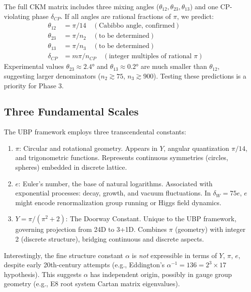 \documentclass[11pt,a4paper]{article}
\begin{document}
The full CKM matrix includes three mixing angles ($\theta_{12}, \theta_{23}, \theta_{13}$) and one CP-violating phase $\delta_{CP}$. If all angles are rational fractions of $\pi$, we predict:
\begin{align}
\theta_{12} &= \pi/14 \quad (\text{Cabibbo angle, confirmed}) \\
\theta_{23} &= \pi/n_2 \quad (\text{to be determined}) \\
\theta_{13} &= \pi/n_3 \quad (\text{to be determined}) \\
\delta_{CP} &= m \pi / n_{CP} \quad (\text{integer multiples of rational } \pi)
\end{align}
Experimental values $\theta_{23} \approx 2.4°$ and $\theta_{13} \approx 0.2°$ are much smaller than $\theta_{12}$, suggesting larger denominators ($n_2 \gtrsim 75$, $n_3 \gtrsim 900$). Testing these predictions is a priority for Phase 3.

\subsection{Three Fundamental Scales}

The UBP framework employs three transcendental constants:
\begin{enumerate}
\item \textbf{$\pi$}: Circular and rotational geometry. Appears in $Y$, angular quantization $\pi/14$, and trigonometric functions. Represents continuous symmetries (circles, spheres) embedded in discrete lattice.

\item \textbf{$e$}: Euler's number, the base of natural logarithms. Associated with exponential processes: decay, growth, and vacuum fluctuations. In $\delta_W = 75e$, $e$ might encode renormalization group running or Higgs field dynamics.

\item \textbf{$Y = \pi/(\pi^2+2)$}: The Doorway Constant. Unique to the UBP framework, governing projection from 24D to 3+1D. Combines $\pi$ (geometry) with integer 2 (discrete structure), bridging continuous and discrete aspects.
\end{enumerate}

Interestingly, the fine structure constant $\alpha$ is \emph{not} expressible in terms of $Y$, $\pi$, $e$, despite early 20th-century attempts (e.g., Eddington's $\alpha^{-1} = 136 = 2^3 \times 17$ hypothesis). This suggests $\alpha$ has independent origin, possibly in gauge group geometry (e.g., E8 root system Cartan matrix eigenvalues).
\end{document}
